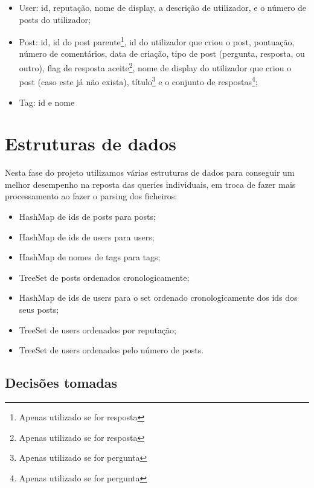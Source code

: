 \documentclass[10pt]{report}
\newcommand\tab[1][0.5cm]{\hspace*{#1}}
\begin{document}
\begin{itemize}

\item User: id, reputação, nome de display, a descrição de utilizador, e o número de posts do utilizador;

\item Post: id, id do post parente\footnote{Apenas utilizado se for resposta}, id do utilizador que criou o post, pontuação, número de comentários, data de criação, tipo de post (pergunta, resposta, ou outro), flag de resposta aceite\footnote{Apenas utilizado se for resposta}, nome de display do utilizador que criou o post (caso este já não exista), título\footnote{Apenas utilizado se for pergunta} e o conjunto de respostas\footnote{Apenas utilizado se for pergunta};

\item Tag: id e nome

\end{itemize}

\section{Estruturas de dados}

\tab Nesta fase do projeto utilizamos várias estruturas de dados para conseguir um melhor desempenho na reposta das queries individuais, em troca de fazer mais processamento ao fazer o parsing dos ficheiros:

\begin{itemize}

\item HashMap de ids de posts para posts;
\item HashMap de ids de users para users;
\item HashMap de nomes de tags para tags;
\item TreeSet de posts ordenados cronologicamente;
\item HashMap de ids de users para o set ordenado cronologicamente dos ids dos seus posts;
\item TreeSet de users ordenados por reputação;
\item TreeSet de users ordenados pelo número de posts.

\end{itemize}

\subsection{Decisões tomadas}
\end{document}

